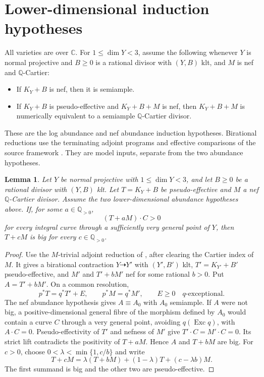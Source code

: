 \documentclass[12pt,a4paper,psamsfonts]{amsart}
\theoremstyle{definition}
\theoremstyle{plain}
\newtheorem{lemma}{Lemma}[section]
\newcommand{\Q}{\mathbb Q}
\newcommand{\C}{\mathbb C}
\begin{document}
\section{Lower-dimensional induction hypotheses}

All varieties are over $\C$. For $1\le\dim Y<3$, assume the
following whenever $Y$ is normal projective and $B\ge0$ is a
rational divisor with $(Y,B)$ klt, and $M$ is nef and $\mathbb{Q}$-Cartier:
\begin{itemize}
\item If $K_Y+B$ is nef, then it is semiample.
\item If $K_Y+B$ is pseudo-effective and $K_Y+B+M$ is nef,
then $K_Y+B+M$ is numerically equivalent to a semiample
$\mathbb{Q}$-Cartier divisor.
\end{itemize}
These are the log abundance and nef abundance induction hypotheses.
Birational reductions use the terminating adjoint programs and effective
comparisons of the source framework \cite[Sections~2 and~8]{NS}.
They are model inputs, separate from the two abundance hypotheses.


\begin{lemma}\label{lem:lower-dimensional}
Let $Y$ be normal projective with $1\le\dim Y<3$, and let
$B\ge0$ be a rational divisor with $(Y,B)$ klt.
Let $T=K_Y+B$ be pseudo-effective and $M$ a nef $\mathbb{Q}$-Cartier divisor.
Assume the two lower-dimensional abundance hypotheses above.
If, for some $a\in\Q_{>0}$,
\[
 (T+aM)\cdot C>0
\]
for every integral curve through a sufficiently very general point of $Y$,
then $T+cM$ is big for every $c\in\Q_{>0}$.
\end{lemma}
\begin{proof}
Use the $M$-trivial adjoint reduction of
\cite[Section~8.2]{NS}, after clearing the Cartier index of $M$.
It gives a birational contraction $Y\dashrightarrow Y'$ with
$(Y',B')$ klt, $T'=K_{Y'}+B'$ pseudo-effective, and $M'$ and
$T'+bM'$ nef for some rational $b>0$. Put $A=T'+bM'$. On a common resolution,
\[
 p^*T=q^*T'+E,\qquad p^*M=q^*M',\qquad E\ge0
 \quad\text{$q$-exceptional}.
\]
The nef abundance hypothesis gives $A\equiv A_0$ with $A_0$ semiample.
If $A$ were not big, a positive-dimensional general fibre of the
morphism defined by $A_0$ would contain a curve $C$ through a very
general point, avoiding $q(\operatorname{Exc}q)$, with $A\cdot C=0$.
Pseudo-effectivity of $T'$ and nefness of $M'$ give
$T'\cdot C=M'\cdot C=0$. Its strict lift contradicts the positivity
of $T+aM$. Hence $A$ and $T+bM$ are big.
For $c>0$, choose $0<\lambda<\min\{1,c/b\}$ and write
\[
 T+cM=\lambda(T+bM)+(1-\lambda)T+(c-\lambda b)M.
\]
The first summand is big and the other two are pseudo-effective.
\end{proof}
\end{document}
